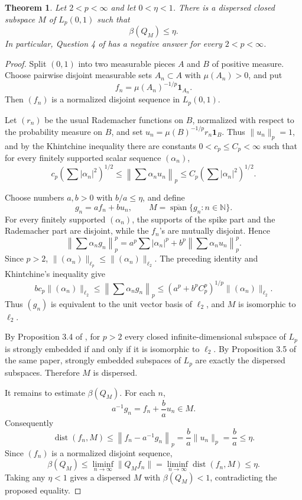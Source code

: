 \documentclass[11pt]{article}
\newtheorem{theorem}{Theorem}
\newcommand{\dist}{\operatorname{dist}}
\newcommand{\spancl}{\overline{\operatorname{span}}}
\begin{document}
\begin{theorem}
Let \(2<p<\infty\) and let \(0<\eta<1\). There is a dispersed closed subspace \(M\) of \(L_p(0,1)\) such that
\[
  \beta(Q_M)\leq \eta.
\]
In particular, Question 4 of \cite{GMM2020} has a negative answer for every \(2<p<\infty\).
\end{theorem}

\begin{proof}
Split \((0,1)\) into two measurable pieces \(A\) and \(B\) of positive measure. Choose pairwise disjoint measurable sets \(A_n\subset A\) with \(\mu(A_n)>0\), and put
\[
  f_n=\mu(A_n)^{-1/p}\mathbf 1_{A_n}.
\]
Then \((f_n)\) is a normalized disjoint sequence in \(L_p(0,1)\).

Let \((r_n)\) be the usual Rademacher functions on \(B\), normalized with respect to the probability measure on \(B\), and set \(u_n=\mu(B)^{-1/p}r_n\mathbf 1_B\). Thus \(\|u_n\|_p=1\), and by the Khintchine inequality there are constants \(0<c_p\leq C_p<\infty\) such that for every finitely supported scalar sequence \((\alpha_n)\),
\[
  c_p\left(\sum |\alpha_n|^2\right)^{1/2}
  \leq \left\|\sum \alpha_n u_n\right\|_p
  \leq C_p\left(\sum |\alpha_n|^2\right)^{1/2}.
\]

Choose numbers \(a,b>0\) with \(b/a\leq \eta\), and define
\[
  g_n=a f_n+b u_n,\qquad M=\spancl\{g_n:n\in\mathbb N\}.
\]
For every finitely supported \((\alpha_n)\), the supports of the spike part and the Rademacher part are disjoint, while the \(f_n\)'s are mutually disjoint. Hence
\[
  \left\|\sum \alpha_n g_n\right\|_p^p
  =a^p\sum |\alpha_n|^p
   +b^p\left\|\sum \alpha_n u_n\right\|_p^p.
\]
Since \(p>2\), \(\|(\alpha_n)\|_{\ell_p}\leq \|(\alpha_n)\|_{\ell_2}\). The preceding identity and Khintchine's inequality give
\[
  b c_p\|(\alpha_n)\|_{\ell_2}
  \leq \left\|\sum \alpha_n g_n\right\|_p
  \leq (a^p+b^p C_p^p)^{1/p}\|(\alpha_n)\|_{\ell_2}.
\]
Thus \((g_n)\) is equivalent to the unit vector basis of \(\ell_2\), and \(M\) is isomorphic to \(\ell_2\).

By Proposition 3.4 of \cite{GMM2020}, for \(p>2\) every closed infinite-dimensional subspace of \(L_p\) is strongly embedded if and only if it is isomorphic to \(\ell_2\). By Proposition 3.5 of the same paper, strongly embedded subspaces of \(L_p\) are exactly the dispersed subspaces. Therefore \(M\) is dispersed.

It remains to estimate \(\beta(Q_M)\). For each \(n\),
\[
  a^{-1}g_n=f_n+\frac{b}{a}u_n\in M.
\]
Consequently
\[
  \dist(f_n,M)\leq \left\|f_n-a^{-1}g_n\right\|_p
  =\frac{b}{a}\|u_n\|_p
  =\frac{b}{a}
  \leq \eta.
\]
Since \((f_n)\) is a normalized disjoint sequence,
\[
  \beta(Q_M)
  \leq \liminf_{n\to\infty}\|Q_M f_n\|
  = \liminf_{n\to\infty}\dist(f_n,M)
  \leq \eta.
\]
Taking any \(\eta<1\) gives a dispersed \(M\) with \(\beta(Q_M)<1\), contradicting the proposed equality.
\end{proof}
\end{document}
